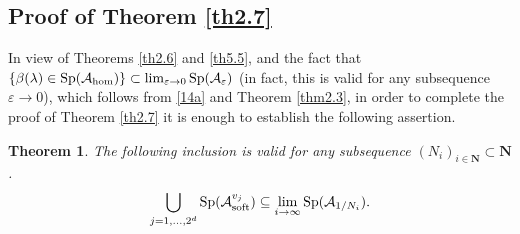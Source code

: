 \documentclass[11pt]{article}
\newcommand\e {\varepsilon}
\newcommand\soft{{\rm soft}}
\def\AA{\mathcal{A}}
\def\l{\lambda}
\def\hom{{\rm hom}}
\DeclareMathOperator{\Sp}{Sp}
\newcommand\N{\mathbf{N}}
\newtheorem{theorem}{Theorem}[section]
\theoremstyle{remark}
\begin{document}
\subsection{Proof of Theorem \ref{th2.7}} \label{s5.3}

In view of Theorems \ref{th2.6} and \ref{th5.5}, and the fact that $\{ \beta(\l) \in \Sp (\AA_\hom)\} \subset \lim_{\e\to 0} \Sp(\AA_{\e})$ (in fact, this is valid for any subsequence $\e\to 0$), which follows from \eqref{14a} and Theorem \ref{thm2.3}, in order to complete the proof of Theorem \ref{th2.7} it is enough to establish the following assertion.

\begin{theorem}\label{krnj1}
	The following inclusion is valid for any subsequence  $(N_i)_{i\in\N}\subset \N$.
	$$	\bigcup_{j=1,\dots,2^d} \mathrm{Sp}(\AA_\soft ^{v_j}) \subseteq \lim_{i \to \infty} \Sp(\AA_{1/{N_i}}).$$
\end{theorem} 		
	
\end{document}

